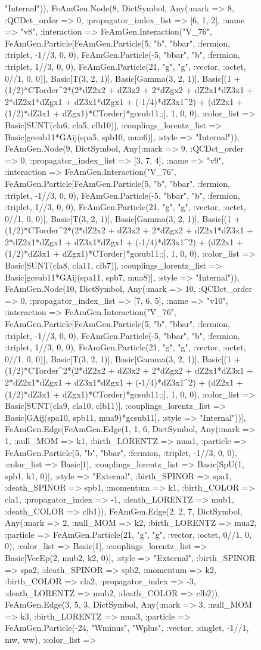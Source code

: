 \documentclass{revtex4}
\begin{document}
\begin{figure}[!htb]
\begin{center}
{"Internal")), FeAmGen.Node(8, Dict{Symbol, Any}(:mark => 8, :QCDct_order => 0, :propagator_index_list => [6, 1, 2], :name => "v8", :interaction => FeAmGen.Interaction("V_76", FeAmGen.Particle[FeAmGen.Particle(5, "b", "bbar", :fermion, :triplet, -1//3, 0, 0), FeAmGen.Particle(-5, "bbar", "b", :fermion, :triplet, 1//3, 0, 0), FeAmGen.Particle(21, "g", "g", :vector, :octet, 0//1, 0, 0)], Basic[T(3, 2, 1)], Basic[Gamma(3, 2, 1)], Basic[(1 + (1/2)*CTorder^2*(2*dZ2x2 + dZ3x2 + 2*dZgx2 + dZ2x1*dZ3x1 + 2*dZ2x1*dZgx1 + dZ3x1*dZgx1 + (-1/4)*dZ3x1^2) + (dZ2x1 + (1/2)*dZ3x1 + dZgx1)*CTorder)*gcsub11;;], 1, 0, 0), :color_list => Basic[SUNT(cla6, cla5, clb10)], :couplings_lorentz_list => Basic[gcsub11*GAij(spa5, spb10, mua6)], :style => "Internal")), FeAmGen.Node(9, Dict{Symbol, Any}(:mark => 9, :QCDct_order => 0, :propagator_index_list => [3, 7, 4], :name => "v9", :interaction => FeAmGen.Interaction("V_76", FeAmGen.Particle[FeAmGen.Particle(5, "b", "bbar", :fermion, :triplet, -1//3, 0, 0), FeAmGen.Particle(-5, "bbar", "b", :fermion, :triplet, 1//3, 0, 0), FeAmGen.Particle(21, "g", "g", :vector, :octet, 0//1, 0, 0)], Basic[T(3, 2, 1)], Basic[Gamma(3, 2, 1)], Basic[(1 + (1/2)*CTorder^2*(2*dZ2x2 + dZ3x2 + 2*dZgx2 + dZ2x1*dZ3x1 + 2*dZ2x1*dZgx1 + dZ3x1*dZgx1 + (-1/4)*dZ3x1^2) + (dZ2x1 + (1/2)*dZ3x1 + dZgx1)*CTorder)*gcsub11;;], 1, 0, 0), :color_list => Basic[SUNT(cla8, cla11, clb7)], :couplings_lorentz_list => Basic[gcsub11*GAij(spa11, spb7, mua8)], :style => "Internal")), FeAmGen.Node(10, Dict{Symbol, Any}(:mark => 10, :QCDct_order => 0, :propagator_index_list => [7, 6, 5], :name => "v10", :interaction => FeAmGen.Interaction("V_76", FeAmGen.Particle[FeAmGen.Particle(5, "b", "bbar", :fermion, :triplet, -1//3, 0, 0), FeAmGen.Particle(-5, "bbar", "b", :fermion, :triplet, 1//3, 0, 0), FeAmGen.Particle(21, "g", "g", :vector, :octet, 0//1, 0, 0)], Basic[T(3, 2, 1)], Basic[Gamma(3, 2, 1)], Basic[(1 + (1/2)*CTorder^2*(2*dZ2x2 + dZ3x2 + 2*dZgx2 + dZ2x1*dZ3x1 + 2*dZ2x1*dZgx1 + dZ3x1*dZgx1 + (-1/4)*dZ3x1^2) + (dZ2x1 + (1/2)*dZ3x1 + dZgx1)*CTorder)*gcsub11;;], 1, 0, 0), :color_list => Basic[SUNT(cla9, cla10, clb11)], :couplings_lorentz_list => Basic[GAij(spa10, spb11, mua9)*gcsub11], :style => "Internal"))], FeAmGen.Edge[FeAmGen.Edge(1, 1, 6, Dict{Symbol, Any}(:mark => 1, :null_MOM => k1, :birth_LORENTZ => mua1, :particle => FeAmGen.Particle(5, "b", "bbar", :fermion, :triplet, -1//3, 0, 0), :color_list => Basic[1], :couplings_lorentz_list => Basic[SpU(1, spb1, k1, 0)], :style => "External", :birth_SPINOR => spa1, :death_SPINOR => spb1, :momentum => k1, :birth_COLOR => cla1, :propagator_index => -1, :death_LORENTZ => mub1, :death_COLOR => clb1)), FeAmGen.Edge(2, 2, 7, Dict{Symbol, Any}(:mark => 2, :null_MOM => k2, :birth_LORENTZ => mua2, :particle => FeAmGen.Particle(21, "g", "g", :vector, :octet, 0//1, 0, 0), :color_list => Basic[1], :couplings_lorentz_list => Basic[VecEp(2, mub2, k2, 0)], :style => "External", :birth_SPINOR => spa2, :death_SPINOR => spb2, :momentum => k2, :birth_COLOR => cla2, :propagator_index => -3, :death_LORENTZ => mub2, :death_COLOR => clb2)), FeAmGen.Edge(3, 5, 3, Dict{Symbol, Any}(:mark => 3, :null_MOM => k3, :birth_LORENTZ => mua3, :particle => FeAmGen.Particle(-24, "Wminus", "Wplus", :vector, :singlet, -1//1, mw, ww), :color_list => }
\end{center}
\end{figure}
\end{document}
